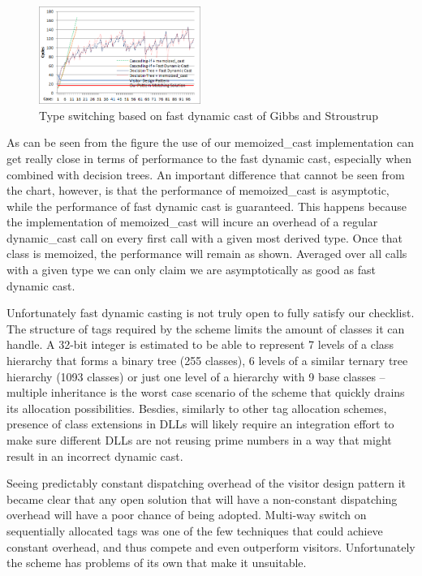 \documentclass[preprint]{sigplanconf}
\begin{document}
\begin{figure}[htbp]
  \centering
    \includegraphics[width=0.47\textwidth]{DCast-vs-Visitors2.png}
  \caption{Type switching based on fast dynamic cast of Gibbs and Stroustrup\cite{FastDynCast}}
  \label{fig:DCastVis2}
\end{figure}

As can be seen from the figure the use of our memoized\_cast implementation can 
get really close in terms of performance to the fast dynamic cast, especially 
when combined with decision trees. An important difference that cannot be seen 
from the chart, however, is that the performance of memoized\_cast is 
asymptotic, while the performance of fast dynamic cast is guaranteed. This 
happens because the implementation of memoized\_cast will incure an overhead of 
a regular dynamic\_cast call on every first call with a given most derived type. 
Once that class is memoized, the performance will remain as shown. Averaged over 
all calls with a given type we can only claim we are asymptotically as good as 
fast dynamic cast.

Unfortunately fast dynamic casting is not truly open to fully satisfy our 
checklist. The structure of tags required by the scheme limits the amount of 
classes it can handle. A 32-bit integer is estimated to be able to represent 7 
levels of a class hierarchy that forms a binary tree (255 classes), 6 levels of 
a similar ternary tree hierarchy (1093 classes) or just one level of a hierarchy 
with 9 base classes -- multiple inheritance is the worst case scenario of the 
scheme that quickly drains its allocation possibilities. Besdies, similarly to 
other tag allocation schemes, presence of class extensions in DLLs will likely 
require an integration effort to make sure different DLLs are not reusing prime 
numbers in a way that might result in an incorrect dynamic cast.

Seeing predictably constant dispatching overhead of the visitor design pattern 
it became clear that any open solution that will have a non-constant dispatching 
overhead will have a poor chance of being adopted. Multi-way switch on 
sequentially allocated tags\cite{Spuler94} was one of the few techniques that 
could achieve constant overhead, and thus compete and even outperform visitors. 
Unfortunately the scheme has problems of its own that make it unsuitable.
\end{document}
